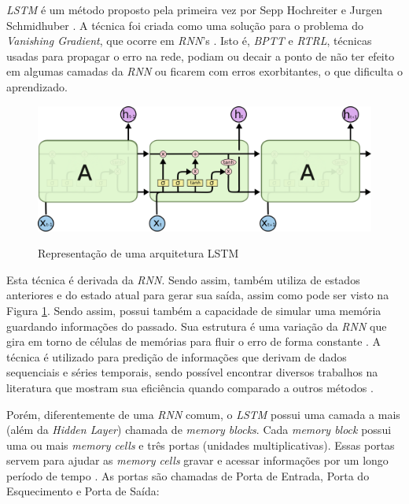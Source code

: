 \textit{\acrshort{LSTM}} é um método proposto pela primeira vez por Sepp Hochreiter e Jurgen Schmidhuber \cite{doi:10.1162/neco.1997.9.8.1735}. A técnica foi criada como uma solução para o problema do \textit{Vanishing Gradient}, que ocorre em \textit{\acrshort{RNN}}'s \cite{doi:10.1162/neco.1997.9.8.1735}. Isto é, \textit{\acrfull{BPTT}} e \textit{\acrfull{RTRL}}, técnicas usadas para propagar o erro na rede, podiam ou decair a ponto de não ter efeito em algumas camadas da \textit{\acrshort{RNN}} ou ficarem com erros exorbitantes, o que dificulta o aprendizado. 

\begin{figure}[htbp]
    \centering
    \includegraphics[scale=0.4]{monography/img/models/lstm3.png}
    \label{figure:lstm}
    \caption[Representação de uma arquitetura LSTM]{Representação de uma arquitetura LSTM\footnotemark}
\end{figure}

Esta técnica é derivada da \textit{\acrshort{RNN}}. Sendo assim, também utiliza de estados anteriores e do estado atual para gerar sua saída, assim como pode ser visto na Figura \ref{figure:lstm}. Sendo assim, possui também a capacidade de simular uma memória guardando informações do passado. Sua estrutura é uma variação da \textit{\acrshort{RNN}} que gira em torno de células de memórias para fluir o erro de forma constante \cite{doi:10.1162/neco.1997.9.8.1735}. A técnica é utilizado para predição de informações que derivam de dados sequenciais e séries temporais, sendo possível encontrar diversos trabalhos na literatura que mostram sua eficiência quando comparado a outros métodos \cite{alex2012}.

Porém, diferentemente de uma \textit{\acrshort{RNN}} comum, o \textit{\acrshort{LSTM}} possui uma camada a mais (além da \textit{Hidden Layer}) chamada de \textit{memory blocks}. Cada \textit{memory block} possui uma ou mais \textit{memory cells} e três portas (unidades multiplicativas). Essas portas servem para ajudar as \textit{memory cells} gravar e acessar informações por um longo período de tempo \cite{alex2012}. As portas são chamadas de Porta de Entrada, Porta do Esquecimento e Porta de Saída:


